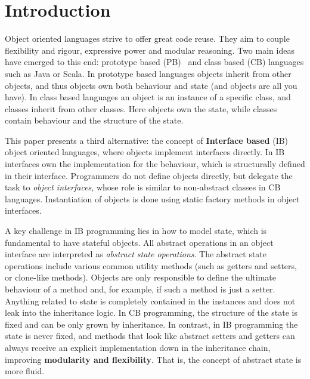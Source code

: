 \section{Introduction}\label{sec:intro}

Object oriented languages strive to offer great code reuse.
They aim to couple flexibility and rigour, expressive power and
modular reasoning.  Two main ideas have emerged to this end: prototype
based (PB)~\cite{Ungar87self} and class based (CB) languages such as
Java or Scala.  In prototype based
languages objects inherit from other objects, and thus objects own
both behaviour and state (and objects are all you have).
In class based languages an object is an instance of a specific class,
and classes inherit from other classes.  Here objects own the state,
while classes contain behaviour and the structure of the state.

This paper presents a third alternative: the concept of
\textbf{Interface based} (IB) object oriented languages, where objects
implement interfaces directly. In IB interfaces own the implementation
for the behaviour, which is structurally defined in their
interface. Programmers do not define objects directly, but delegate
the task to \emph{object interfaces}, whose role is similar to non-abstract 
classes in CB languages. Instantiation of objects is
done using static factory methods in object interfaces.

A key challenge in IB programming lies in how to model state, which is
fundamental to have stateful objects. All abstract operations in an
object interface are interpreted as \emph{abstract state
  operations}. The abstract state operations include various common
utility methods (such as getters and setters, or clone-like
methods). Objects are only responsible to define the ultimate
behaviour of a method and, for example, if such a method is just a
setter. Anything related to state is completely contained in the
instances and does not leak into the inheritance logic.  In CB
programming, the structure of the state is fixed and can be only grown
by inheritance.  In contrast, in IB programming the state is never
fixed, and methods that look like abstract setters and getters
can always receive an explicit implementation down in the inheritance
chain, improving \textbf{modularity and flexibility}.  That is, the
concept of abstract state is more fluid.

